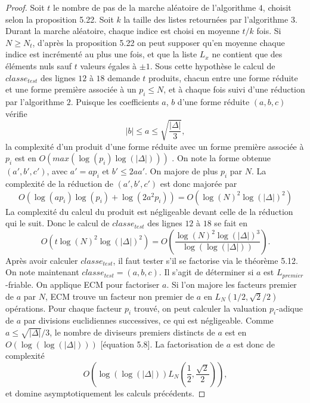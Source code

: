 \begin{proof}
	Soit $t$ le nombre de pas de la marche aléatoire de l'algorithme $4$, choisit selon la proposition 5.22. Soit $k$ la taille des listes retournées par l'algorithme $3$. Durant la marche aléatoire, chaque indice est choisi en moyenne $t/k$ fois. Si $N \geq N_{t}$, d'après la proposition 5.22 on peut supposer qu'en moyenne chaque indice est incrémenté au plus une fois, et que la liste $L_{x}$ ne contient que des éléments nuls sauf $t$ valeurs égales à $\pm 1$. Sous cette hypothèse le calcul de $classe_{test}$ des lignes $12$ à $18$ demande $t$ produits, chacun entre une forme réduite et une forme première associée à un $p_{i} \leq N$, et à chaque fois suivi d'une réduction par l'algorithme $2$. Puisque les coefficients $a$, $b$ d'une forme réduite $(a,b,c)$ vérifie
	\begin{equation*}
		|b| \leq a \leq \sqrt{\frac{|\Delta|}{3}},
	\end{equation*} 
	la complexité d'un produit d'une forme réduite avec un forme première associée à $p_{i}$ est en $O(max(\log(p_{i})\log(|\Delta|)))$ \cite{JaoSoukharev}. On note la forme obtenue $(a',b',c')$, avec $a' = ap_{i}$ et $b'\leq 2aa'$. On majore de plus $p_{i}$ par $N$. La complexité de la réduction de $(a',b',c')$ est donc majorée par 
	\begin{equation*}
		O(\log(a p_{i})\log(p_{i}) + \log(2a^2 p_{i})) = O(\log(N)^2\log(|\Delta|)^2)
	\end{equation*}
	La complexité du calcul du produit est négligeable devant celle de la réduction qui le suit. Donc le calcul de $classe_{test}$ des lignes $12$ à $18$ se fait en
	\begin{equation*}
		O(t\log(N)^2\log(|\Delta|)^2) = O\left( \frac{\log(N)^2\log(|\Delta|)^3}{\log(\log(|\Delta|))}\right) .
	\end{equation*}
	Après avoir calculer $classe_{test}$, il faut tester s'il se factorise via le théorème 5.12. On note maintenant $classe_{test} = (a,b,c)$. Il s'agit de déterminer si $a$ est $L_{premier}$-friable. On applique ECM pour factoriser $a$. Si l'on majore les facteurs premier de $a$ par $N$, ECM trouve un facteur non premier de $a$ en $L_{N}(1/2,\sqrt{2}/2)$ opérations. Pour chaque facteur $p_i$ trouvé, on peut calculer la valuation $p_i$-adique de $a$ par divisions euclidiennes successives, ce qui est négligeable. Comme $a \leq \sqrt{|\Delta|}/3$, le nombre de diviseurs premiers distincts de $a$ est en $O(\log(\log(|\Delta|)))$ \cite{Riesel1985}[équation 5.8]. La factorisation de $a$ est donc de complexité
	\begin{equation*}
		O\left( \log(\log(|\Delta|))L_{N}\left( \frac{1}{2},\frac{\sqrt{2}}{2}\right) \right), 
	\end{equation*}
	et domine asymptotiquement les calculs précédents. 
\end{proof}


